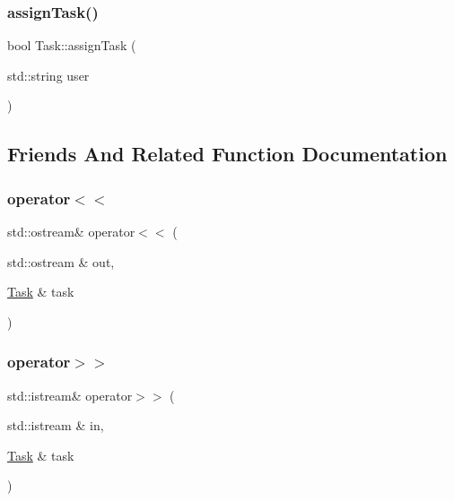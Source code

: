\subsubsection{\texorpdfstring{assign\+Task()}{assignTask()}}
{\footnotesize\ttfamily bool Task\+::assign\+Task (\begin{DoxyParamCaption}\item[{std\+::string}]{user }\end{DoxyParamCaption})}



\subsection{Friends And Related Function Documentation}
\mbox{\label{class_task_a3f7a3060e6047db0aa8323a32c1d8a51}} 
\subsubsection{\texorpdfstring{operator$<$$<$}{operator<<}}
{\footnotesize\ttfamily std\+::ostream\& operator$<$$<$ (\begin{DoxyParamCaption}\item[{std\+::ostream \&}]{out,  }\item[{\mbox{\hyperlink{class_task}{Task}} \&}]{task }\end{DoxyParamCaption})\hspace{0.3cm}{\ttfamily [friend]}}

\mbox{\label{class_task_a2e885fe507a64c4f0a48041a5f857222}} 
\subsubsection{\texorpdfstring{operator$>$$>$}{operator>>}}
{\footnotesize\ttfamily std\+::istream\& operator$>$$>$ (\begin{DoxyParamCaption}\item[{std\+::istream \&}]{in,  }\item[{\mbox{\hyperlink{class_task}{Task}} \&}]{task }\end{DoxyParamCaption})\hspace{0.3cm}{\ttfamily [friend]}}



